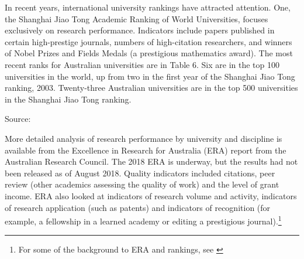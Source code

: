 \documentclass{grattan}
\begin{document}
In recent years, international university rankings have attracted attention. One, the Shanghai Jiao Tong Academic Ranking of World Universities, focuses exclusively on research performance. Indicators include papers published in certain high-prestige journals, numbers of high-citation researchers, and winners of Nobel Prizes and Fields Medals (a prestigious mathematics award). The most recent ranks for Australian universities are in Table 6. Six are in the top 100 universities in the world, up from two in the first year of the Shanghai Jiao Tong ranking, 2003. Twenty-three Australian universities are in the top 500 universities in the Shanghai Jiao Tong ranking.

\begin{table} \caption{Top eight Australian universities, Shanghai Jiao Tong university rankings, 2018}


\end{table}

Source: \textcite[][]{ARWU2018academicrankingof}

More detailed analysis of research performance by university and discipline is available from the Excellence in Research for Australia (ERA) report from the Australian Research Council. The 2018 ERA is underway, but the results had not been released as of August 2018. Quality indicators included citations, peer review (other academics assessing the quality of work) and the level of grant income. ERA also looked at indicators of research volume and activity, indicators of research application (such as patents) and indicators of recognition (for example, a fellowship in a learned academy or editing a prestigious journal).\footnote{For some of the background to ERA and rankings, see \textcite[][chapter~6.]{Coaldrake2016raisingthestakes}}
\end{document}

